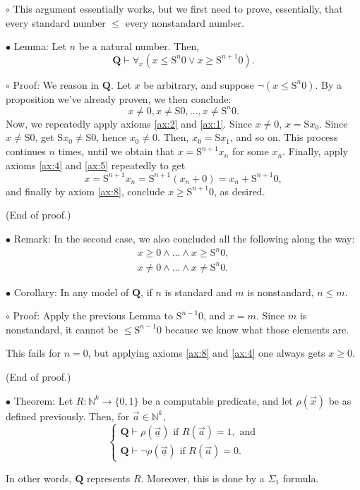 \documentclass{article}
\newcommand{\N}{\mathbb{N}}
\newcommand{\RQ}{\mathbf{Q}}
\newcommand{\suc}{\mathrm{S}}
\newcommand\Point[1]{\noindent \hspace{\labelsep} {
$\bullet$ #1} \smallskip}
\newcommand\point[1]{\noindent \hspace{\labelsep} {\small $\circ$ #1} \smallskip}
\newcommand\proofend{\hfill(End of proof.)}
\begin{document}
\point{This argument essentially works, but we first need to prove, essentially, that every standard number $\leq$ every nonstandard number.}

\Point{Lemma: Let $n$ be a natural number. Then,
\begin{equation}
\RQ \vdash \forall_x (x \leq \suc^n 0 \lor x \geq \suc^{n+1} 0).
\end{equation}}

\point{Proof: We reason in $\RQ$. Let $x$ be arbitrary, and suppose $\neg(x \leq \suc^n 0)$. By a proposition we've already proven, we then conclude:
\begin{equation}
x \neq 0, x \neq \suc 0, \dots, x \neq \suc^n 0.
\end{equation}
Now, we repeatedly apply axioms \ref{ax:2} and \ref{ax:1}. Since $x \neq 0$, $x = \suc x_0$. Since $x \neq \suc 0$, get $\suc x_0 \neq \suc 0$, hence $x_0 \neq 0$. Then, $x_0 = \suc x_1$, and so on. This process continues $n$ times, until we obtain that $x = \suc^{n+1} x_n$ for some $x_n$. Finally, apply axioms \ref{ax:4} and \ref{ax:5} repeatedly to get
\begin{equation}
x = \suc^{n+1}x_n = \suc^{n+1}(x_n + 0) = x_n + \suc^{n+1}0,
\end{equation}
and finally by axiom \ref{ax:8}, conclude $x \geq \suc^{n+1}0$, as desired.

\proofend
}

\Point{Remark: In the second case, we also concluded all the following along the way:
\begin{equation}
\begin{gathered}
x \geq 0 \land \dots \land x \geq \suc^n 0,\\
x \neq 0 \land \dots \land x \neq \suc^n 0.
\end{gathered}
\end{equation}}

\Point{Corollary: In any model of $\RQ$, if $n$ is standard and $m$ is nonstandard, $n \leq m$.}

\point{Proof: Apply the previous Lemma to $\suc^{n-1} 0$, and $x = m$. Since $m$ is nonstandard, it cannot be $\leq \suc^{n-1} 0$ because we know what those elements are.

This fails for $n = 0$, but applying axioms \ref{ax:8} and \ref{ax:4} one always gets $x \geq 0$.

\proofend}

\Point{Theorem: Let $R \colon \N^k \to \{0,1\}$ be a computable predicate, and let $\rho(\vec x)$ be as defined previously. Then, for $\vec a \in \N^k$,
\begin{equation}
\begin{cases}
\RQ \vdash \rho(\underline{\vec a}) \text{ if } R(\vec a) = 1, \text{ and}\\
\RQ \vdash \neg\rho(\underline{\vec a}) \text{ if } R(\vec a) = 0.
\end{cases}
\end{equation}

In other words, $\RQ$ represents $R$. Moreover, this is done by a $\Sigma_1$ formula.}
\end{document}
